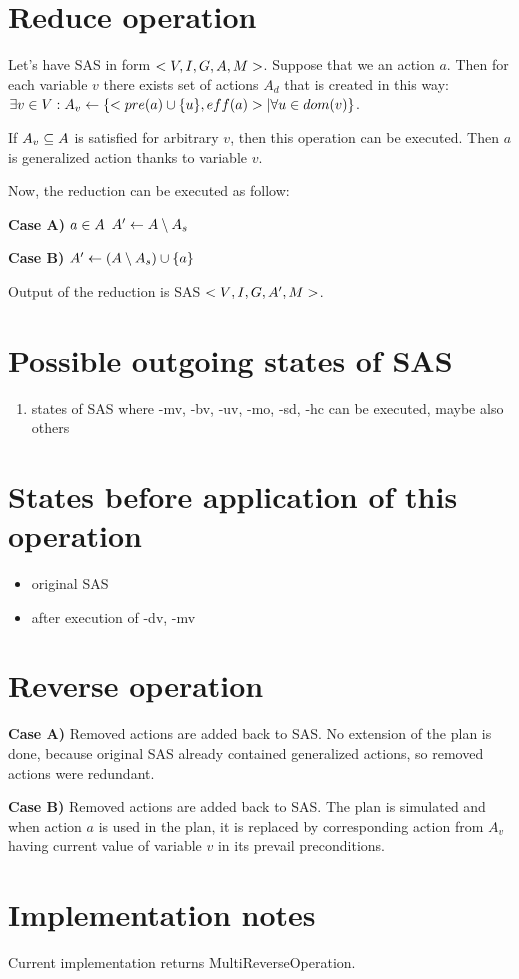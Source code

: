 	
	\section{Reduce operation}
	Let's have SAS in form $<V, I, G, A, M{}>$. Suppose that we an action $a$. Then for each variable $v$ there exists set of actions $A_d$ that is created in this way: $\exists v \in V: A_v \leftarrow \{<pre(a) \cup \{u\},eff(a)> | \forall u \in dom(v) \} $.
	
	If 	$A_v \subseteq A$ is satisfied for arbitrary $v$, then this operation can be executed. Then $a$ is generalized action thanks to variable $v$. 
	
	Now, the reduction can be executed as follow:
	
	\textbf{Case A)} $a \in A$
	$A{}' \leftarrow A \setminus A_s$
	
	\textbf{Case B)}
	$A{}' \leftarrow (A \setminus A_s) \cup \{a\}$
	
		
	Output of the reduction is SAS $<V{}, I{}, G{}, A{}', M{}>$.
	
	
	\section{Possible outgoing states of SAS}
	\begin{enumerate}
		\item states of SAS where -mv, -bv, -uv, -mo, -sd, -hc can be executed, maybe also others
	\end{enumerate}
	
	\section{States before application of this operation}
	\begin{itemize}
		\item original SAS
		\item after execution of -dv, -mv
	\end{itemize}
	
	
	\section{Reverse operation}
	\textbf{Case A)} Removed actions are added back to SAS. No extension of the plan is done, because original SAS already contained generalized actions, so removed actions were redundant.
	
	\textbf{Case B)} Removed actions are added back to SAS. The plan is simulated and when action $a$ is used in the plan, it is replaced by corresponding action from $A_v$ having current value of variable $v$ in its prevail preconditions.
	
	
	\section{Implementation notes}
	Current implementation returns MultiReverseOperation.